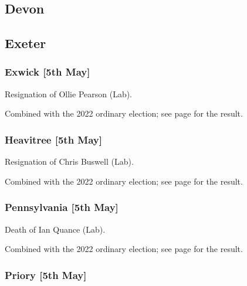 \documentclass[a4paper,openany]{book}
\begin{document}
\begin{resultsiii}
\section{Devon}

\subsection*{Exeter}

\subsubsection*{Exwick \hspace*{\fill}\nolinebreak[1]%
	\enspace\hspace*{\fill}
	[5th May]}


Resignation of Ollie Pearson (Lab).

Combined with the 2022 ordinary election; see page \pageref{ExeterExwick} for the result.

\subsubsection*{Heavitree \hspace*{\fill}\nolinebreak[1]%
	\enspace\hspace*{\fill}
	[5th May]}


Resignation of Chris Buswell (Lab).

Combined with the 2022 ordinary election; see page \pageref{ExeterHeavitree} for the result.

\subsubsection*{Pennsylvania \hspace*{\fill}\nolinebreak[1]%
	\enspace\hspace*{\fill}
	[5th May]}


Death of Ian Quance (Lab).

Combined with the 2022 ordinary election; see page \pageref{ExeterPennsylvania} for the result.

\subsubsection*{Priory \hspace*{\fill}\nolinebreak[1]%
	\enspace\hspace*{\fill}
	[5th May]}


\end{resultsiii}
\end{document}
